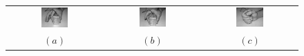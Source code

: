 \documentclass{article}
\begin{document}

\begin{figure}[!t] \centering
  \begin{tabular}{ccc}
    \includegraphics[width=0.30\textwidth]{grip1.eps} &
    \includegraphics[width=0.30\textwidth]{grip2.eps} &
    \includegraphics[width=0.30\textwidth]{grip3.eps} \\
    $(a)$ & $(b)$ & $(c)$ \\
  \end{tabular}
\end{figure}
\end{document}
